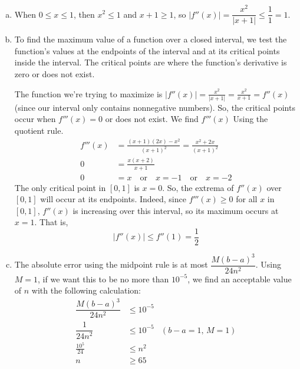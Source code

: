 \begin{solution}


\begin{enumerate}[(a)]
\item When $0 \leq x \leq1$, then $x^2 \leq 1$ and $x+1 \geq 1$, so $|f''(x)| = \dfrac{x^2}{|x+1|}\leq \dfrac{1}{1}=1$.

\item
To find the maximum value of a function over a closed interval, we test the function's values at the endpoints of the interval and at its critical points inside the interval. The critical points are where the function's derivative is zero or does not exist.

The function we're trying to maximize is $|f''(x)| = \frac{x^2}{|x+1|} = \frac{x^2}{x+1}=f''(x)$ (since our interval only contains nonnegative numbers). So, the critical points occur when $f'''(x) = 0$ or does not exist. We find $f'''(x)$ Using the quotient rule.
\begin{align*}
f'''(x)&=\frac{(x+1)(2x)-x^2}{(x+1)^2}=\frac{x^2+2x}{(x+1)^2}\\
0&=\frac{x(x+2)}{x+1}\\
0&=x \quad\mbox{or}\quad x=-1\quad\mbox{or}\quad x=-2
\end{align*}
The only critical point in $[0,1]$ is $x=0$. So, the extrema of $f''(x)$ over $[0,1]$ will occur at its endpoints. Indeed, since $f'''(x) \geq 0$ for all $x$ in $[0,1]$, $f''(x)$ is increasing over this interval, so its maximum occurs at $x=1$. That is,
\[|f''(x)|\leq f''(1)=\frac{1}{2}\]

\item The absolute  error using the midpoint rule is at most $\dfrac{M(b-a)^3}{24n^2}$. Using $M=1$, if we want this to be no more than $10^{-5}$, we find an acceptable value of $n$ with the following calculation:
\begin{align*}
\dfrac{M(b-a)^3}{24n^2}&\leq 10^{-5}\\
\dfrac{1}{24n^2}&\leq 10^{-5}&(b-a=1,\,M=1)\\
\frac{10^5}{24} & \leq n^2\\
n & \geq 65
\end{align*}


\end{enumerate}
\end{solution}
